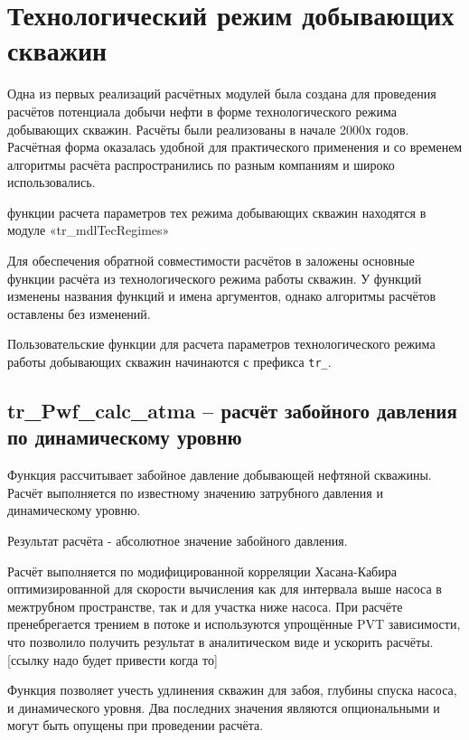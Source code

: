 

\section{Технологический режим добывающих скважин}
Одна из первых реализаций расчётных модулей \unf{} была создана для проведения расчётов потенциала добычи нефти в форме технологического режима добывающих скважин. Расчёты были реализованы в начале 2000х годов. Расчётная форма оказалась удобной для практического применения и со временем алгоритмы расчёта распространились по разным компаниям и широко использовались.

функции расчета параметров тех режима добывающих скважин находятся в модуле «tr\_mdlTecRegimes»

Для обеспечения обратной совместимости расчётов в \unf{} заложены основные функции расчёта из технологического режима работы скважин. У функций изменены названия функций и имена аргументов, однако алгоритмы расчётов оставлены без изменений.

Пользовательские функции для расчета параметров технологического режима работы добывающих скважин начинаются с префикса  \texttt{tr_}. 

\newpage
\subsection{tr\_Pwf\_calc\_atma – расчёт забойного давления по динамическому уровню}

Функция рассчитывает забойное давление добывающей нефтяной скважины. Расчёт выполняется по известному значению затрубного давления и динамическому уровню. \cite{Khasanov_TR_2006}

Результат расчёта - абсолютное значение забойного давления. 

Расчёт выполняется по модифицированной корреляции Хасана-Кабира оптимизированной для скорости вычисления как для интервала выше насоса в межтрубном пространстве, так и для участка ниже насоса. При расчёте пренебрегается трением в потоке и используются упрощённые PVT зависимости, что позволило получить результат в аналитическом виде и ускорить расчёты. [ссылку надо будет привести когда то] 

Функция позволяет учесть удлинения скважин для забоя, глубины спуска насоса, и динамического уровня. Два последних значения являются опциональными и могут быть опущены при проведении расчёта. 




